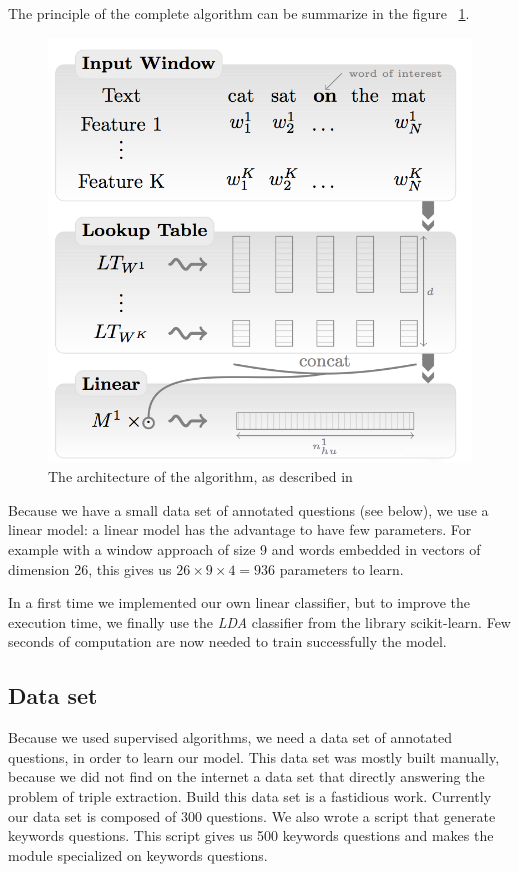 The principle of the complete algorithm can be summarize in the figure ~\ref{sandalone:model}.

\begin{figure}[!ht]
  \centering
  \caption{The architecture of the algorithm, as described in \cite{collobert}}
  \label{sandalone:model}
    \includegraphics[scale=0.5]{../NLP-standalone-images/model.png}
\end{figure}

Because we have a small data set of annotated questions (see below), we use a linear model: a linear model has the advantage to have few parameters.
For example with a window approach of size 9 and words embedded in vectors of dimension 26,  this gives us $26\times 9\times 4 = 936$ parameters to learn.

In a first time we implemented our own linear classifier, but to improve the execution time, we finally use the \textit{LDA} classifier from the library scikit-learn. Few seconds of computation are now needed to train successfully the model.

\subsection{Data set}

Because we used supervised algorithms, we need a data set of annotated questions, in order to learn our model.
This data set was mostly built manually, because we did not find on the internet a data set that directly answering the problem of triple extraction.
Build this data set is a fastidious work. Currently our data set is composed of 300 questions.
We also wrote a script that generate keywords questions. This script gives us 500 keywords questions and makes the module specialized on keywords questions.

